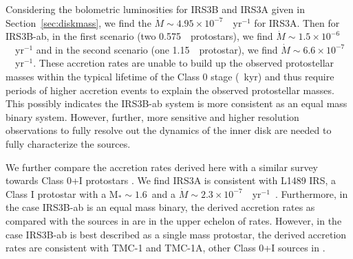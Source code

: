 Considering the bolometric luminosities for IRS3B and IRS3A given in Section~\ref{sec:diskmass}, we find the $\dot{M}\sim4.95\times10^{-7}$~\solm~yr$^{-1}$ for IRS3A. Then for IRS3B-ab, in the first scenario (two 0.575~\solm~protostars), we find $\dot{M}\sim1.5\times10^{-6}$~\solm~yr$^{-1}$ and in the second scenario (one 1.15~\solm~protostar), we find $\dot{M}\sim6.6\times10^{-7}$~\solm~yr$^{-1}$. These accretion rates are unable to build up the observed protostellar masses within the typical lifetime of the Class 0 stage (~kyr) and thus require periods of higher accretion events to explain the observed protostellar masses. This possibly indicates the IRS3B-ab system is more consistent as an equal mass binary system. However, further, more sensitive and higher resolution observations to fully resolve out the dynamics of the inner disk are needed to fully characterize the sources.

We further compare the accretion rates derived here with a similar survey towards Class 0+I protostars \citep{2017ApJ...834..178Y}. We find IRS3A is consistent with L1489 IRS, a Class I protostar with a M$_{*}\sim1.6$~\solm\space\citep[][]{2013ApJ...770..123G}\space and a $\dot{M}\sim2.3\times10^{-7}$~\solm~yr$^{-1}$~\citep[][]{2014ApJ...793....1Y}. Furthermore, in the case IRS3B-ab is an equal mass binary, the derived accretion rates as compared with the sources in \citet{2017ApJ...834..178Y}\space are in the upper echelon of rates. However, in the case IRS3B-ab is best described as a single mass protostar, the derived accretion rates are consistent with TMC-1 and TMC-1A, other Class 0+I sources in \citet{2017ApJ...834..178Y}.





